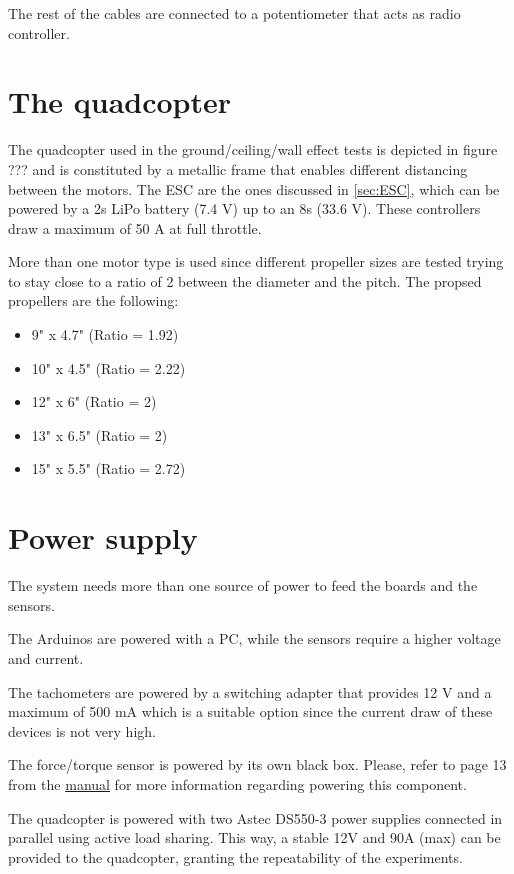 \documentclass[a4paper]{article}
\begin{document}
{The rest of the cables are connected to a potentiometer that acts as radio controller.




\section{The quadcopter}

The quadcopter used in the ground/ceiling/wall effect tests is depicted in figure ??? and is constituted by a metallic frame that enables different distancing between the motors. The ESC are the ones discussed in \autoref{sec:ESC}, which can be powered by a 2s LiPo battery (7.4 V) up to an 8s (33.6 V). These controllers draw a maximum of 50 A at full throttle.

More than one motor type is used since different propeller sizes are tested trying to stay close to a ratio of 2 between the diameter and the pitch. The propsed propellers are the following:

\begin{itemize}
	\item 9" x 4.7" (Ratio = 1.92)
	\item 10" x 4.5" (Ratio = 2.22)
	\item 12" x 6" (Ratio = 2)
	\item 13" x 6.5" (Ratio = 2)
	\item 15" x 5.5" (Ratio = 2.72)
\end{itemize}




\section{Power supply}

The system needs more than one source of power to feed the boards and the sensors. 

The Arduinos are powered with a PC, while the sensors require a higher voltage and current.

The tachometers are powered by a switching adapter that provides 12 V and a maximum of 500 mA which is a suitable option since the current draw of these devices is not very high.

The force/torque sensor is powered by its own black box. Please, refer to page 13 from the \hyperref{https://www.ati-ia.com/app_content/documents/9620-05-DAQ.pdf}{category}{name}{manual} for more information regarding powering this component.

The quadcopter is powered with two Astec DS550-3 power supplies connected in parallel using active load sharing. This way, a stable 12V and 90A (max) can be provided to the quadcopter, granting the repeatability of the experiments.

}
\end{document}
